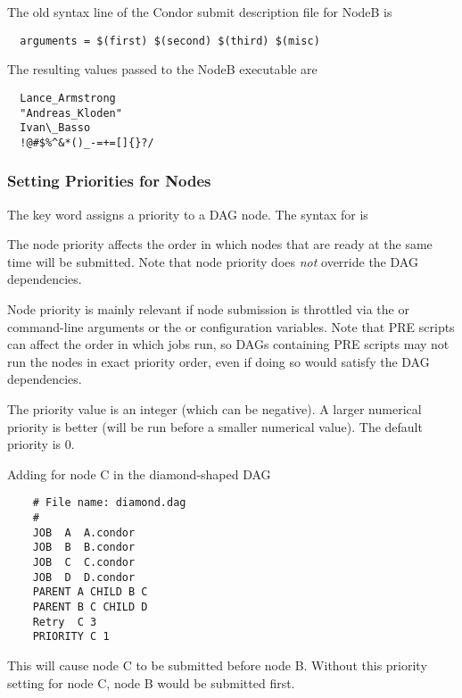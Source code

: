 The old syntax  line of the Condor submit description file
for NodeB is
\footnotesize
\begin{verbatim}
  arguments = $(first) $(second) $(third) $(misc)
\end{verbatim}
\normalsize

The resulting values passed to the NodeB executable are
\footnotesize
\begin{verbatim}
  Lance_Armstrong
  "Andreas_Kloden"
  Ivan\_Basso
  !@#$%^&*()_-=+=[]{}?/
\end{verbatim}
\normalsize

\subsubsection{Setting Priorities for Nodes}

The  key word assigns a priority to a DAG node.
The syntax for  is

  

The node priority affects the order in which nodes that are ready
at the same time will be submitted.  Note that node priority does
\emph{not} override the DAG dependencies.

Node priority is mainly relevant if
node submission is throttled via the  or 
command-line arguments or the  or
 configuration variables.  Note that PRE
scripts can affect the order in which jobs run, so DAGs containing
PRE scripts may not run the nodes in exact priority order, even if
doing so would satisfy the DAG dependencies.

The priority value is an integer (which can be negative).  A larger
numerical priority is better (will be run before a smaller numerical
value).  The default priority is 0.

Adding  for node C in the diamond-shaped
DAG
\footnotesize
\begin{verbatim}
    # File name: diamond.dag
    #
    JOB  A  A.condor 
    JOB  B  B.condor 
    JOB  C  C.condor	
    JOB  D  D.condor
    PARENT A CHILD B C
    PARENT B C CHILD D
    Retry  C 3
    PRIORITY C 1
\end{verbatim}
\normalsize

This will cause node C to be submitted before node B.
Without this priority setting for node C, node B would be submitted first.

